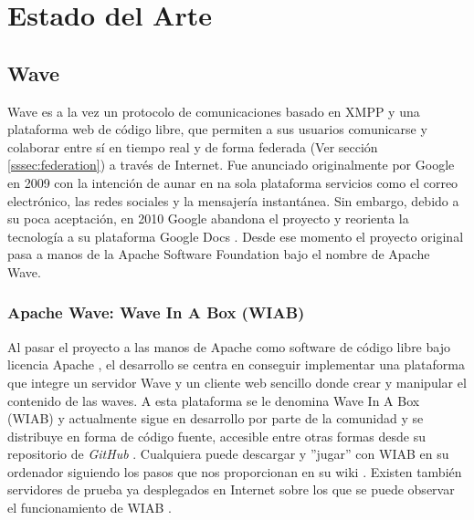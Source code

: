 \newpage
\thispagestyle{sectioned}
\chapter{Estado del Arte}

\section{Wave}

	Wave es a la vez un protocolo de comunicaciones basado en XMPP\cite{ref:wave_over_xmpp} y una plataforma web de código libre, que permiten a sus usuarios comunicarse y colaborar entre sí en tiempo real y de forma federada (Ver sección \ref{sssec:federation}) a través de Internet. Fue anunciado originalmente por Google en 2009 \cite{ref:wave_announcement} con la intención de aunar en na sola plataforma servicios como el correo electrónico, las redes sociales y la mensajería instantánea. Sin embargo, debido a su poca aceptación, en 2010 Google abandona el proyecto \cite{ref:google_wave_end} y reorienta la tecnología a su plataforma Google Docs \cite{ref:google_docs}. Desde ese momento el proyecto original pasa a manos de la Apache Software Foundation bajo el nombre de Apache Wave.

	\subsection{Apache Wave: Wave In A Box (WIAB)}
	
	Al pasar el proyecto a las manos de Apache como software de código libre bajo licencia Apache \cite{ref:apache_license}, el desarrollo se centra en conseguir implementar una plataforma que integre un servidor Wave y un cliente web sencillo donde crear y manipular el contenido de las waves. A esta plataforma se le denomina Wave In A Box (WIAB) y actualmente sigue en desarrollo por parte de la comunidad y se distribuye en forma de código fuente, accesible entre otras formas desde su repositorio de \textit{GitHub} \cite{ref:wave_in_a_box_github}. Cualquiera puede descargar y ''jugar'' con WIAB en su ordenador siguiendo los pasos que nos proporcionan en su wiki \cite{ref:wave_in_a_box_wiki}. Existen también servidores de prueba ya desplegados en Internet sobre los que se puede observar el funcionamiento de WIAB \cite {ref:wave_in_a_box_server}.
	
